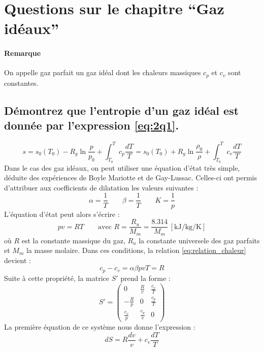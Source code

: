 \section{Questions sur le chapitre ``Gaz idéaux''}
\paragraph{Remarque} On appelle gaz parfait un gaz idéal dont les chaleurs massiques $c_p$ et $c_v$ sont constantes.
\subsection{Démontrez que l'entropie d'un gaz idéal est donnée par l'expression \ref{eq:2q1}.}
\begin{equation} s = s_0(T_0) - R_g\ln{\frac{p}{p_0}} + \int_{T_0}^T c_p\frac{dT}{T} = s_0(T_0) + R_g\ln{\frac{\rho_0}{\rho}} + \int_{T_0}^T c_v\frac{dT}{T} \label{eq:2q1}\end{equation}
Dans le cas des gaz idéaux, on peut utiliser une équation d'état très simple, déduite des expériences de Boyle Mariotte et de Gay-Lussac. Celles-ci ont permis d'attribuer aux coefficients de dilatation les valeurs suivantes :
\begin{equation} \alpha = \frac{1}{T} \qquad \beta = \frac{1}{T} \qquad K = \frac{1}{p} \label{eq:coef_ideaux}\end{equation}
L'équation d'état peut alors s'écrire :
\begin{equation} pv = RT \qquad \text{avec } R = \frac{R_u}{M_m} = \frac{8.314}{M_m} \, \left[\si{\kilo\joule\per\kilo\gram\per\kelvin}\right] \end{equation}
où $R$ est la constante massique du gaz, $R_u$ la constante universele des gaz parfaits et $M_m$ la masse molaire. Dans ces conditions, la relation \ref{eq:relation_chaleur} devient :
\begin{equation} c_p-c_v = \alpha\beta pvT = R\end{equation}
Suite à cette propriété, la matrice $S'$ prend la forme :
\begin{equation} S' = \begin{pmatrix}0 & \frac{R}{v} & \frac{c_v}{T} \\ -\frac{R}{p} & 0 & \frac{c_p}{T} \\ \frac{c_v}{p} & \frac{c_p}{v} & 0 \end{pmatrix} \label{eq:matriceSideal}\end{equation}
La première équation de ce système nous donne l'expression :
\begin{equation} dS = R\frac{dv}{v} + c_v\frac{dT}{T} \end{equation}
